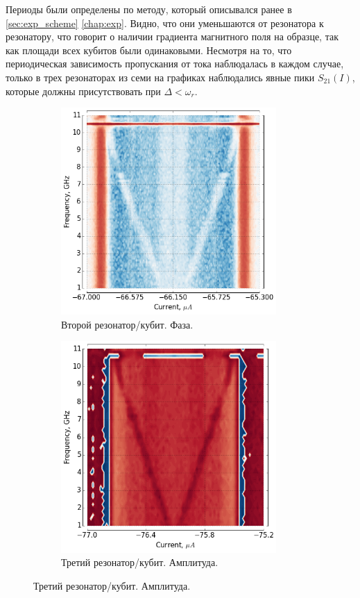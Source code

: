 \documentclass[12pt, twoside]{report}
\numberwithin{equation}{section}
\numberwithin{figure}{section}
\begin{document}
Периоды были определены по методу, который описывался ранее в \autoref{sec:exp_scheme} \autoref{chap:exp}. Видно, что они уменьшаются от резонатора к резонатору, что говорит о наличии градиента магнитного поля на образце, так как площади всех кубитов были одинаковыми.  Несмотря на то, что периодическая зависимость пропускания от тока наблюдалась в каждом случае, только в трех резонаторах из семи на графиках наблюдались явные пики $S_{21}(I)$, которые должны присутствовать при $\Delta < \omega_r$. 


\begin{figure}
\centering
\begin{subfigure}[t]{0.45\textwidth}
\centering
\includegraphics[width=0.9\textwidth]{Pictures/two-tone_spectrum2}
\caption{Второй резонатор/кубит. Фаза.}
\end{subfigure}%
\begin{subfigure}[t]{0.45\textwidth}
\centering
\includegraphics[width=0.9\textwidth]{Pictures/two-tone_spectrum1}
\caption{Третий резонатор/кубит. Амплитуда.}
\end{subfigure}


\end{figure}
\end{document}
